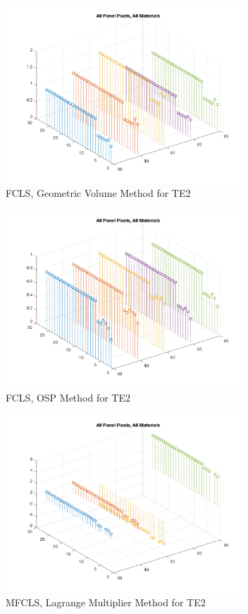 \documentclass[journal]{IEEEtran}
\begin{document}
\begin{figure}[!h]
    \centering
    \includegraphics[width=3.5in]{gfcls_te2_allmaterials.png}
    \caption{FCLS, Geometric Volume Method for TE2}
    \label{fig:gfcls_te2}
\end{figure}

\begin{figure}[!h]
    \centering
    \includegraphics[width=3.5in]{osp_fcls_te2_allmaterials.png}
    \caption{FCLS, OSP Method for TE2}
    \label{fig:osp_fcls_te2}
\end{figure}

\begin{figure}[!h]
    \centering
    \includegraphics[width=3.5in]{mfcls2_te2_allmaterials.png}
    \caption{MFCLS, Lagrange Multiplier Method for TE2}
    \label{fig:mfcls2_te2}
\end{figure}
\end{document}
